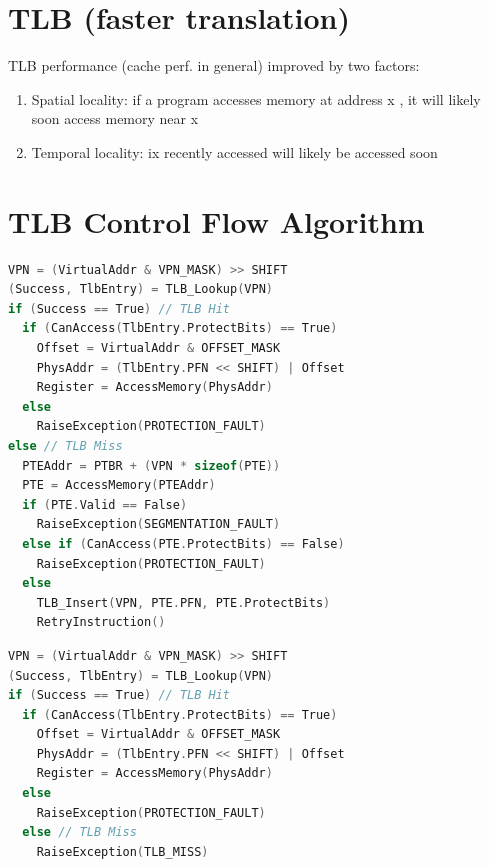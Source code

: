\section*{TLB (faster translation)}
TLB performance (cache perf. in general) improved by two factors:
\begin{enumerate}
\item Spatial locality:  if a program accesses memory at address x , it
will likely soon access memory near x
\item Temporal locality:  ix recently accessed will likely be accessed soon
\end{enumerate}
\section*{TLB Control Flow Algorithm}
\begin{minipage}{.66\linewidth}
\begin{lstlisting}[language=c]
VPN = (VirtualAddr & VPN_MASK) >> SHIFT
(Success, TlbEntry) = TLB_Lookup(VPN)
if (Success == True) // TLB Hit
  if (CanAccess(TlbEntry.ProtectBits) == True)
    Offset = VirtualAddr & OFFSET_MASK
    PhysAddr = (TlbEntry.PFN << SHIFT) | Offset
    Register = AccessMemory(PhysAddr)
  else
    RaiseException(PROTECTION_FAULT)
else // TLB Miss
  PTEAddr = PTBR + (VPN * sizeof(PTE))
  PTE = AccessMemory(PTEAddr)
  if (PTE.Valid == False)
    RaiseException(SEGMENTATION_FAULT)
  else if (CanAccess(PTE.ProtectBits) == False)
    RaiseException(PROTECTION_FAULT)
  else
    TLB_Insert(VPN, PTE.PFN, PTE.ProtectBits)
    RetryInstruction()
\end{lstlisting}
\begin{lstlisting}[language=c]
VPN = (VirtualAddr & VPN_MASK) >> SHIFT
(Success, TlbEntry) = TLB_Lookup(VPN)
if (Success == True) // TLB Hit
  if (CanAccess(TlbEntry.ProtectBits) == True)
    Offset = VirtualAddr & OFFSET_MASK
    PhysAddr = (TlbEntry.PFN << SHIFT) | Offset
    Register = AccessMemory(PhysAddr)
  else
    RaiseException(PROTECTION_FAULT)
  else // TLB Miss
    RaiseException(TLB_MISS)
\end{lstlisting}
\end{minipage}
